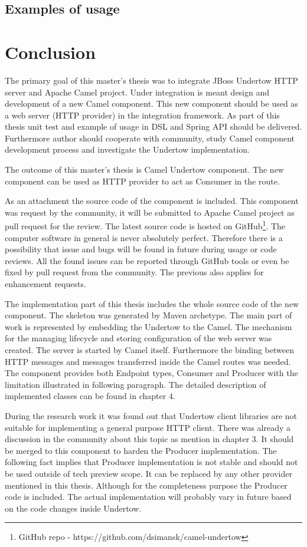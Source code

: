\documentclass[12pt,final,oneside]{fithesis2}
\begin{document}
\section{Examples of usage}



\chapter{Conclusion}
The primary goal of this master's thesis was to integrate JBoss Undertow HTTP server and Apache Camel project. Under integration is meant design and development of a new Camel component. This new component should be used as a web server (HTTP provider) in the integration framework. As part of this thesis unit test and example of usage in DSL and Spring API should be delivered. Furthermore author should cooperate with community, study Camel component development process and investigate the Undertow implementation.

The outcome of this master's thesis is Camel Undertow component. The new component can be used as HTTP provider to act as Consumer in the route. 

As an attachment the source code of the component is included. This component was request by the community, it will be submitted to Apache Camel project as pull request for the review. The latest source code is hosted on GitHub\footnote{GitHub repo - https://github.com/dsimansk/camel-undertow}. The computer software in general is never absolutely perfect. Therefore there is a possibility that issue and bugs will be found in future during usage or code reviews.  All the found issues can be reported through GitHub tools or even be fixed by pull request from the community. The previous also applies for enhancement requests.

The implementation part of this thesis includes the whole source code of the new component. The skeleton was generated by Maven archetype. The main part of work is represented by embedding the Undertow to the Camel. The mechanism for the managing lifecycle and storing configuration of the web server was created. The server is started by Camel itself. Furthermore the binding between HTTP messages and messages transferred inside the Camel routes was needed. The component provides both Endpoint types, Consumer and Producer with the limitation illustrated in following paragraph. The detailed description of implemented classes can be found in chapter 4.

During the research work it was found out that Undertow client libraries are not suitable for implementing a general purpose HTTP client.
There was already a discussion in the community about this topic as mention in chapter 3. It should be merged to this component to harden the Producer implementation. The following fact implies that Producer implementation is not stable and should not be used outside of tech preview scope. It can be replaced by any other provider mentioned in this thesis. Although for the completeness purpose the Producer code is included. The actual implementation will probably vary in future based on the code changes inside Undertow.
\end{document}
